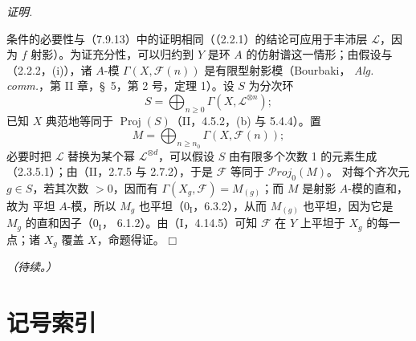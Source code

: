 \documentclass[UTF8,fontset=none,11pt,oneside,openany]{ctexbook}
\providecommand{\square}{\mdlgwhtsquare}
\newenvironment{proof}{%
  \par\smallskip\noindent\textit{证明.}\ %
}{\hfill$\square$\par}
\newcommand{\oldpage}[2][]{%
  \hypertarget{ega-source-page-#1-#2}{}%
  \marginnote{\scriptsize\textbf{#1}~|~#2}\ignorespaces}
\begin{document}
\begin{proof}
条件的必要性与（7.9.13）中的证明相同（（2.2.1）的结论可应用于丰沛层
$\mathscr L$，因为 $f$ 射影）。为证充分性，可以归约到 $Y$ 是环
$A$ 的仿射谱这一情形；由假设与（2.2.2，(i)），诸 $A$-模
$\Gamma(X,\mathscr F(n))$ 是有限型射影模（Bourbaki，
\emph{Alg. comm.}，第 II 章，\S~5，第 2 号，定理 1）。设 $S$ 为分次环
\[
  S=\bigoplus_{n\geq0}\Gamma(X,\mathscr L^{\otimes n}) ;
\]
已知 $X$ 典范地等同于 $\operatorname{Proj}(S)$（II，4.5.2，(b) 与
5.4.4）。置
\[
  M=\bigoplus_{n\geq n_0}\Gamma(X,\mathscr F(n)) ;
\]
必要时把 $\mathscr L$ 替换为某个幂 $\mathscr L^{\otimes d}$，可以假设
$S$ 由有限多个次数 1 的元素生成（2.3.5.1）；由（II，2.7.5 与
2.7.2），于是 $\mathscr F$ 等同于 $\mathscr P\!roj_0(M)$。
对每个齐次元 $g\in S$，若其次数 $>0$，因而有
$\Gamma(X_g,\mathscr F)=M_{(g)}$；而 $M$ 是射影 $A$-模的直和，故为
平坦 $A$-模，所以 $M_g$ 也平坦（$0_{\mathrm I}$，6.3.2），从而
$M_{(g)}$ 也平坦，因为它是 $M_g$ 的直和因子（$0_{\mathrm I}$，
6.1.2）。由（I，4.14.5）可知 $\mathscr F$ 在 $Y$ 上平坦于
$X_g$ 的每一点；诸 $X_g$ 覆盖 $X$，命题得证。
\end{proof}

\bigskip
\noindent\emph{（待续。）}

\clearpage
\oldpage[III]{213}
\section*{记号索引}
\end{document}
